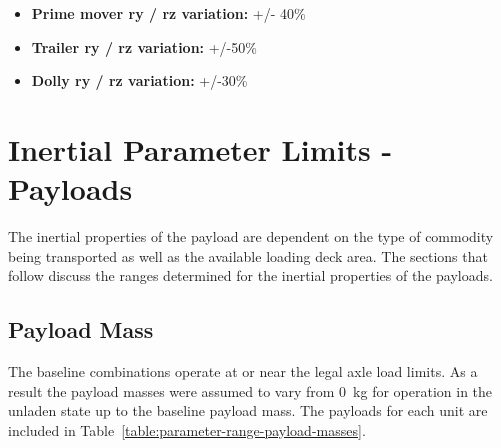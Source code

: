 \begin{itemize}
\item \textbf{Prime mover \gls{ry} / \gls{rz} variation:} +/- 40\%
\item \textbf{Trailer \gls{ry} / \gls{rz} variation:} +/-50\%
\item \textbf{Dolly \gls{ry} / \gls{rz} variation:} +/-30\%
\end{itemize}


\section{Inertial Parameter Limits - Payloads}\label{section:pr-inertial-parameter-limits-payloads}

The inertial properties of the payload are dependent on the type of commodity being transported as well as the available loading deck area. The sections that follow discuss the ranges determined for the inertial properties of the payloads.

\subsection{Payload Mass}\label{section:pr-payload-masses}

The baseline combinations operate at or near the legal axle load limits. As a result the payload masses were assumed to vary from 0~kg for operation in the unladen state up to the baseline payload mass. The payloads for each unit are included in Table~\ref{table:parameter-range-payload-masses}.

